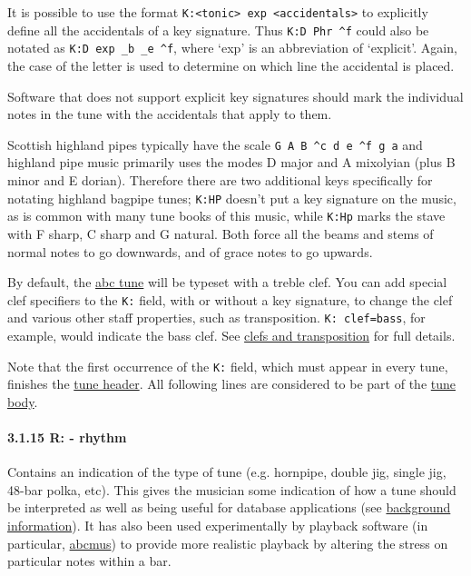 \documentclass[oneside]{book}
\let\oldparagraph\paragraph
\renewcommand{\paragraph}[1]{\oldparagraph{#1}\mbox{}}
\begin{document}
It is possible to use the format
\texttt{K:\textless{}tonic\textgreater{}\ exp\ \textless{}accidentals\textgreater{}}
to explicitly define all the accidentals of a key signature. Thus
\texttt{K:D\ Phr\ \^{}f} could also be notated as
\texttt{K:D\ exp\ \_b\ \_e\ \^{}f}, where `exp' is an abbreviation of
`explicit'. Again, the case of the letter is used to determine on which
line the accidental is placed.

Software that does not support explicit key signatures should mark the
individual notes in the tune with the accidentals that apply to them.

Scottish highland pipes typically have the scale
\texttt{G\ A\ B\ \^{}c\ d\ e\ \^{}f\ g\ a} and highland pipe music
primarily uses the modes D major and A mixolyian (plus B minor and E
dorian). Therefore there are two additional keys specifically for
notating highland bagpipe tunes; \texttt{K:HP} doesn't put a key
signature on the music, as is common with many tune books of this music,
while \texttt{K:Hp} marks the stave with F sharp, C sharp and G natural.
Both force all the beams and stems of normal notes to go downwards, and
of grace notes to go upwards.

By default, the \protect\hyperlink{abc_tune_definition}{abc tune} will
be typeset with a treble clef. You can add special clef specifiers to
the \texttt{K:} field, with or without a key signature, to change the
clef and various other staff properties, such as transposition.
\texttt{K:\ clef=bass}, for example, would indicate the bass clef. See
\protect\hyperlink{clefs_and_transposition}{clefs and transposition} for
full details.

Note that the first occurrence of the \texttt{K:} field, which must
appear in every tune, finishes the
\protect\hyperlink{tune_header_definition}{tune header}. All following
lines are considered to be part of the
\protect\hyperlink{tune_body_definition}{tune body}.

\hypertarget{rrhythm}{\paragraph{3.1.15 R: - rhythm}\label{rrhythm}}

Contains an indication of the type of tune (e.g. hornpipe, double jig,
single jig, 48-bar polka, etc). This gives the musician some indication
of how a tune should be interpreted as well as being useful for database
applications (see
\protect\hyperlink{bdfsbackground_information}{background information}).
It has also been used experimentally by playback software (in
particular, \href{http://abcnotation.com/software\#abcmus}{abcmus}) to
provide more realistic playback by altering the stress on particular
notes within a bar.
\end{document}
